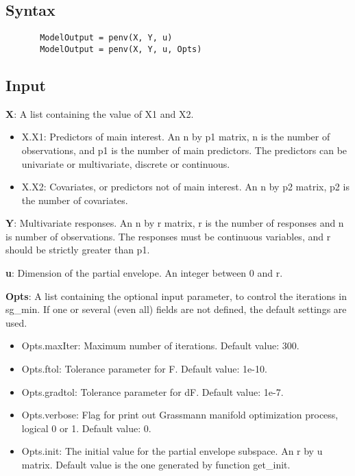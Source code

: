\documentclass[a4paper,11pt,openany]{memoir}
\begin{document}
\subsection*{Syntax}


\begin{verbatim}       ModelOutput = penv(X, Y, u)
       ModelOutput = penv(X, Y, u, Opts)\end{verbatim}
    

\subsection*{Input}

\begin{par}
\textbf{X}: A list containing the value of X1 and X2.
\end{par} \vspace{1em}
\begin{itemize}
\setlength{\itemsep}{-1ex}
   \item X.X1: Predictors of main interest. An n by p1 matrix, n is the number of observations, and p1 is the number of main predictors. The predictors can be univariate or multivariate, discrete or continuous.
   \item X.X2: Covariates, or predictors not of main interest.  An n by p2 matrix, p2 is the number of covariates.
\end{itemize}
\begin{par}
\textbf{Y}: Multivariate responses. An n by r matrix, r is the number of responses and n is number of observations. The responses must be continuous variables, and r should be strictly greater than p1.
\end{par} \vspace{1em}
\begin{par}
\textbf{u}: Dimension of the partial envelope. An integer between 0 and r.
\end{par} \vspace{1em}
\begin{par}
\textbf{Opts}: A list containing the optional input parameter, to control the iterations in sg\_min. If one or several (even all) fields are not defined, the default settings are used.
\end{par} \vspace{1em}
\begin{itemize}
\setlength{\itemsep}{-1ex}
   \item Opts.maxIter: Maximum number of iterations.  Default value: 300.
   \item Opts.ftol: Tolerance parameter for F.  Default value: 1e-10.
   \item Opts.gradtol: Tolerance parameter for dF.  Default value: 1e-7.
   \item Opts.verbose: Flag for print out Grassmann manifold optimization process, logical 0 or 1. Default value: 0.
   \item Opts.init: The initial value for the partial envelope subspace. An r by u matrix. Default value is the one generated by function get\_init.
\end{itemize}
\end{document}
